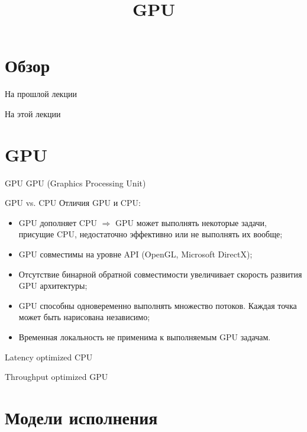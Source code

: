 

\title{GPU}



\begin{frame}
\titlepage
\end{frame}

\section*{Обзор}

\begin{frame}{На прошлой лекции}
\end{frame}

\begin{frame}{На этой лекции}
\tableofcontents
\end{frame}

\section{GPU}

\begin{frame}{GPU}
GPU (\abbr Graphics Processing Unit)
\end{frame}

\begin{frame}{GPU vs. CPU}
Отличия GPU и CPU:
\begin{itemize}
    \item GPU дополняет CPU $\Rightarrow$ GPU может выполнять некоторые задачи,
    присущие CPU, недостаточно эффективно или не выполнять их вообще;
    \item GPU совместимы на уровне API (OpenGL, Microsoft DirectX);
    \item Отсутствие бинарной обратной совместимости увеличивает скорость
    развития GPU архитектуры;
    \item GPU способны одновеременно выполнять множество потоков. Каждая точка
    может быть нарисована независимо;
    \item Временная локальность не применима к выполняемым GPU задачам.
\end{itemize}
\end{frame}

\begin{frame}
Latency optimized CPU

Throughput optimized GPU
\end{frame}

\section{Модели исполнения}

